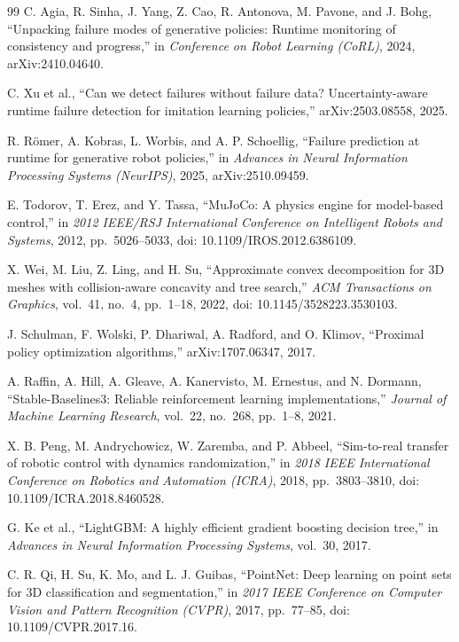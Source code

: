 \documentclass{misisarticle}
\begin{document}
\begin{thebibliography}{99}
 C. Agia, R. Sinha, J. Yang, Z. Cao, R. Antonova, M. Pavone, and J. Bohg, “Unpacking failure modes of generative policies: Runtime monitoring of consistency and progress,” in \textit{Conference on Robot Learning (CoRL)}, 2024, arXiv:2410.04640.

 C. Xu et al., “Can we detect failures without failure data? Uncertainty-aware runtime failure detection for imitation learning policies,” arXiv:2503.08558, 2025.

 R. Römer, A. Kobras, L. Worbis, and A. P. Schoellig, “Failure prediction at runtime for generative robot policies,” in \textit{Advances in Neural Information Processing Systems (NeurIPS)}, 2025, arXiv:2510.09459.

 E. Todorov, T. Erez, and Y. Tassa, “MuJoCo: A physics engine for model-based control,” in \textit{2012 IEEE/RSJ International Conference on Intelligent Robots and Systems}, 2012, pp.~5026--5033, doi: 10.1109/IROS.2012.6386109.

 X. Wei, M. Liu, Z. Ling, and H. Su, “Approximate convex decomposition for 3D meshes with collision-aware concavity and tree search,” \textit{ACM Transactions on Graphics}, vol.~41, no.~4, pp.~1--18, 2022, doi: 10.1145/3528223.3530103.

 J. Schulman, F. Wolski, P. Dhariwal, A. Radford, and O. Klimov, “Proximal policy optimization algorithms,” arXiv:1707.06347, 2017.

 A. Raffin, A. Hill, A. Gleave, A. Kanervisto, M. Ernestus, and N. Dormann, “Stable-Baselines3: Reliable reinforcement learning implementations,” \textit{Journal of Machine Learning Research}, vol.~22, no.~268, pp.~1--8, 2021.

 X. B. Peng, M. Andrychowicz, W. Zaremba, and P. Abbeel, “Sim-to-real transfer of robotic control with dynamics randomization,” in \textit{2018 IEEE International Conference on Robotics and Automation (ICRA)}, 2018, pp.~3803--3810, doi: 10.1109/ICRA.2018.8460528.

 G. Ke et al., “LightGBM: A highly efficient gradient boosting decision tree,” in \textit{Advances in Neural Information Processing Systems}, vol.~30, 2017.

 C. R. Qi, H. Su, K. Mo, and L. J. Guibas, “PointNet: Deep learning on point sets for 3D classification and segmentation,” in \textit{2017 IEEE Conference on Computer Vision and Pattern Recognition (CVPR)}, 2017, pp.~77--85, doi: 10.1109/CVPR.2017.16.


\end{thebibliography}
\end{document}
